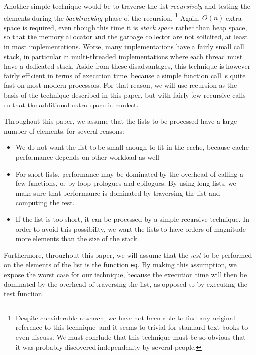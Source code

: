 Another simple technique would be to traverse the list
\emph{recursively} and testing the elements during the
\emph{backtracking} phase of the recursion.%
\footnote{Despite considerable research, we have not been able to find
  any original reference to this technique, and it seems to trivial
  for standard text books to even discuss.  We must conclude that this
  technique must be so obvious that it was probably discovered
  independenlty by several people.}
Again, $O(n)$ extra space
is required, even though this time it is \emph{stack space} rather
than heap space, so that the memory allocator and the garbage
collector are not solicited, at least in most implementations.  Worse,
many implementations have a fairly small call stack, in particular in
multi-threaded implementations where each thread must have a dedicated
stack.  Aside from these disadvantages, this technique is however
fairly efficient in terms of execution time, because a simple function
call is quite fast on most modern processors.  For that reason, we
will use recursion as the basis of the technique described in this
paper, but with fairly few recursive calls so that the additional
extra space is modest.

Throughout this paper, we assume that the lists to be processed have a
large number of elements, for several reasons:

\begin{itemize}
\item We do not want the list to be small enough to fit in the cache,
  because cache performance depends on other workload as well.
\item For short lists, performance may be dominated by the overhead of
  calling a few functions, or by loop prologues and epilogues.  By
  using long lists, we make sure that performance is dominated by
  traversing the list and computing the test.
\item If the list is too short, it can be processed by a simple
  recursive technique.  In order to avoid this possibility, we want
  the lists to have orders of magnitude more elements than the size of
  the stack.
\end{itemize}

Furthermore, throughout this paper, we will assume that the
\emph{test} to be performed on the elements of the list is the
function \texttt{eq}.  By making this assumption, we expose the worst
case for our technique, because the execution time will then be
dominated by the overhead of traversing the list, as opposed to by
executing the test function.

